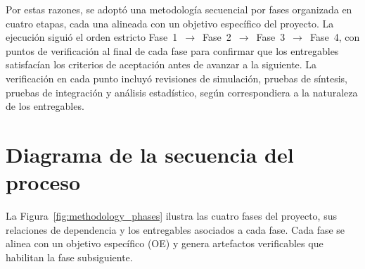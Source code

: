 Por estas razones, se adoptó una metodología secuencial por
fases organizada en cuatro etapas, cada una alineada con un objetivo
específico del proyecto. La ejecución siguió el orden estricto
Fase~1~$\rightarrow$~Fase~2~$\rightarrow$~Fase~3~$\rightarrow$~Fase~4,
con puntos de verificación al final de cada fase para confirmar que los
entregables satisfacían los criterios de aceptación antes de avanzar a
la siguiente. La verificación en cada punto incluyó revisiones de
simulación, pruebas de síntesis, pruebas de integración y análisis
estadístico, según correspondiera a la naturaleza de los entregables.

\section{Diagrama de la secuencia del proceso}
\label{sec:secuencia}

La Figura~\ref{fig:methodology_phases} ilustra las cuatro fases del
proyecto, sus relaciones de dependencia y los entregables asociados a
cada fase. Cada fase se alinea con un objetivo específico (OE) y genera
artefactos verificables que habilitan la fase subsiguiente.

